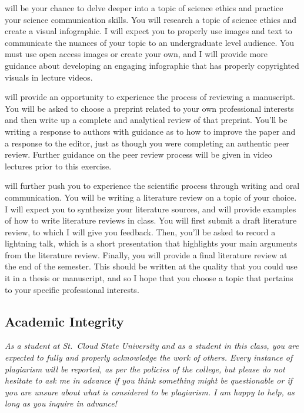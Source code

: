 \documentclass{tufte-handout}
\begin{document}
\begin{fullwidth} 


 will be your chance to delve deeper into a topic of science ethics and practice your science communication skills. You will research a topic of science ethics and create a visual infographic. I will expect you to properly use images and text to communicate the nuances of your topic to an undergraduate level audience. You must use open access images or create your own, and I will provide more guidance about developing an engaging infographic that has properly copyrighted visuals in lecture videos.


 will provide an opportunity to experience the process of reviewing a manuscript. You will be asked to choose a preprint related to your own professional interests and then write up a complete and analytical review of that preprint. You'll be writing a response to authors with guidance as to how to improve the paper and a response to the editor, just as though you were completing an authentic peer review. Further guidance on the peer review process will be given in video lectures prior to this exercise. 

 will further push you to experience the scientific process through writing and oral communication. You will be writing a literature review on a topic of your choice. I will expect you to synthesize your literature sources, and will provide examples of how to write literature reviews in class. You will first submit a draft literature review, to which I will give you feedback. Then, you'll be asked to record a lightning talk, which is a short presentation that highlights your main arguments from the literature review. Finally, you will provide a final literature review at the end of the semester. This should be written at the quality that you could use it in a thesis or manuscript, and so I hope that you choose a topic that pertains to your specific professional interests.  

\subsection{Academic Integrity}



\emph{As a student at St.\ Cloud State University and as a student in this class, you are expected to fully and properly acknowledge the work of others. Every instance of plagiarism will be reported, as per the policies of the college, but please do not hesitate to ask me in advance if you think something might be questionable or if you are unsure about what is considered to be plagiarism. I am happy to help, as long as you inquire in advance! }


\end{fullwidth}
\end{document}
